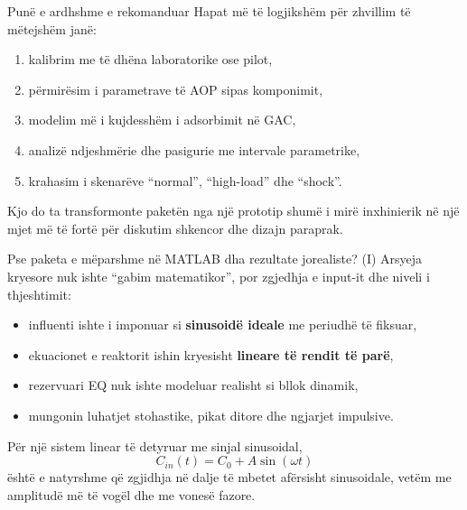 \documentclass[aspectratio=169]{beamer}
\begin{document}
\begin{frame}{Punë e ardhshme e rekomanduar}
\justifying
Hapat më të logjikshëm për zhvillim të mëtejshëm janë:
\begin{enumerate}
    \item kalibrim me të dhëna laboratorike ose pilot,
    \item përmirësim i parametrave të AOP sipas komponimit,
    \item modelim më i kujdesshëm i adsorbimit në GAC,
    \item analizë ndjeshmërie dhe pasigurie me intervale parametrike,
    \item krahasim i skenarëve ``normal'', ``high-load'' dhe ``shock''.
\end{enumerate}
Kjo do ta transformonte paketën nga një prototip shumë i mirë inxhinierik në një mjet më të fortë për diskutim shkencor dhe dizajn paraprak.
\end{frame}

\begin{frame}{Pse paketa e mëparshme në MATLAB dha rezultate jorealiste? (I)}
\justifying
Arsyeja kryesore nuk ishte ``gabim matematikor'', por \alert{zgjedhja e input-it dhe niveli i thjeshtimit}:
\begin{itemize}
    \item influenti ishte i imponuar si \textbf{sinusoidë ideale} me periudhë të fiksuar,
    \item ekuacionet e reaktorit ishin kryesisht \textbf{lineare të rendit të parë},
    \item rezervuari EQ nuk ishte modeluar realisht si bllok dinamik,
    \item mungonin luhatjet stohastike, pikat ditore dhe ngjarjet impulsive.
\end{itemize}
Për një sistem linear të detyruar me sinjal sinusoidal,
\[
C_{in}(t)=C_0+A\sin(\omega t)
\]
është e natyrshme që zgjidhja në dalje të mbetet afërsisht sinusoidale, vetëm me amplitudë më të vogël dhe me vonesë fazore.
\end{frame}
\end{document}
